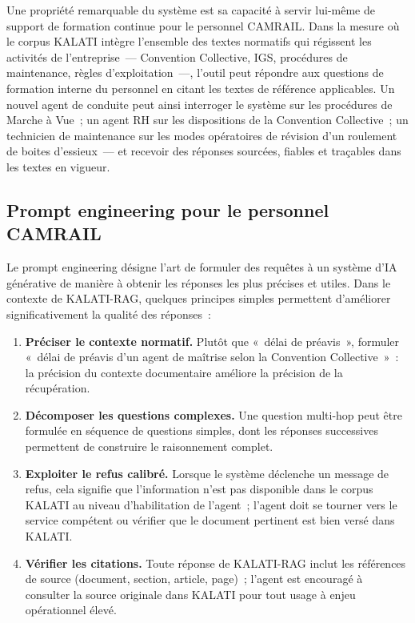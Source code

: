 \documentclass[12pt,a4paper]{report}
\begin{document}
Une propriété remarquable du système est sa capacité à servir lui-même de support de formation
continue pour le personnel CAMRAIL. Dans la mesure où le corpus KALATI intègre l'ensemble des
textes normatifs qui régissent les activités de l'entreprise~--- Convention Collective, IGS,
procédures de maintenance, règles d'exploitation~---, l'outil peut répondre aux questions de
formation interne du personnel en citant les textes de référence applicables. Un nouvel agent
de conduite peut ainsi interroger le système sur les procédures de Marche à Vue~; un agent RH
sur les dispositions de la Convention Collective~; un technicien de maintenance sur les modes
opératoires de révision d'un roulement de boites d'essieux~--- et recevoir des réponses sourcées,
fiables et traçables dans les textes en vigueur.

\subsection{Prompt engineering pour le personnel CAMRAIL}

Le prompt engineering désigne l'art de formuler des requêtes à un système d'IA générative de
manière à obtenir les réponses les plus précises et utiles. Dans le contexte de KALATI-RAG,
quelques principes simples permettent d'améliorer significativement la qualité des réponses~:

\begin{enumerate}
  \item \textbf{Préciser le contexte normatif.} Plutôt que «~délai de préavis~», formuler
    «~délai de préavis d'un agent de maîtrise selon la Convention Collective~»~: la précision
    du contexte documentaire améliore la précision de la récupération.
  \item \textbf{Décomposer les questions complexes.} Une question multi-hop peut être formulée
    en séquence de questions simples, dont les réponses successives permettent de construire
    le raisonnement complet.
  \item \textbf{Exploiter le refus calibré.} Lorsque le système déclenche un message de refus,
    cela signifie que l'information n'est pas disponible dans le corpus KALATI au niveau
    d'habilitation de l'agent~; l'agent doit se tourner vers le service compétent ou vérifier
    que le document pertinent est bien versé dans KALATI.
  \item \textbf{Vérifier les citations.} Toute réponse de KALATI-RAG inclut les références de
    source (document, section, article, page)~; l'agent est encouragé à consulter la source
    originale dans KALATI pour tout usage à enjeu opérationnel élevé.
\end{enumerate}
\end{document}
